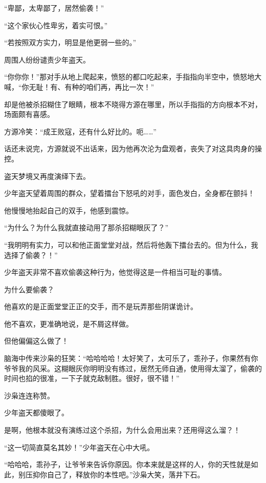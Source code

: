 
\begin{this_body}

“卑鄙，太卑鄙了，居然偷袭！”

“这个家伙心性卑劣，着实可恨。”

“若按照双方实力，明显是他更弱一些的。”

周围人纷纷谴责少年盗天。

“你你你！”那对手从地上爬起来，愤怒的都口吃起来，手指指向半空中，愤怒地大喊，“你无耻！有、有种的咱们再，再比一次！”

却是他被杀招糊住了眼睛，根本不晓得方源在哪里，所以手指指的方向根本不对，场面颇有喜感。

方源冷笑：“成王败寇，还有什么好比的。呃……”

话还未说完，方源就说不出话来，因为他再次沦为盘观者，丧失了对这具肉身的操控。

盗天梦境又再度演绎下去。

少年盗天望着周围的群众，望着擂台下怒吼的对手，面色发白，全身都在颤抖！

他慢慢地抬起自己的双手，他感到震惊。

“为什么？为什么我就直接动用了那杀招糊眼灰了？”

“我明明有实力，可以和他正面堂堂对战，然后将他轰下擂台去的。但为什么，我选择了偷袭？！”

少年盗天非常不喜欢偷袭这种行为，他觉得这是一件相当可耻的事情。

为什么要偷袭？

他喜欢的是正面堂堂正正的交手，而不是玩弄那些阴谋诡计。

他不喜欢，更准确地说，是不屑这样做。

但他偏偏这么做了！

脑海中传来沙枭的狂笑：“哈哈哈哈！太好笑了，太可乐了，乖孙子，你果然有你爷爷我的风采。这糊眼灰你明明没有练过，居然无师自通，使用得太溜了，偷袭的时间也掐的很准，一下子就克敌制胜。很好，很不错！”

沙枭连连称赞。

少年盗天都傻眼了。

是啊，他根本就没有演练过这个杀招，为什么会用出来？还用得这么溜？！

“这一切简直莫名其妙！”少年盗天在心中大吼。

“哈哈哈，乖孙子，让爷爷来告诉你原因。你本来就是这样的人，你的天性就是如此，别压抑你自己了，释放你的本性吧。”沙枭大笑，落井下石。


\end{this_body}
